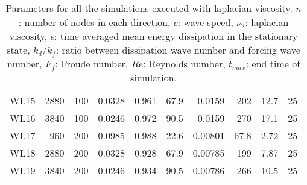 \begin{table}
\begin{center}
\begin{tabular}{lrrrrrrrrr}
WL15 & 2880 &  100 &   0.0328 &       0.961 &                    67.9 &  0.0159 &   202 &           12.7 &          25 \\
WL16 & 3840 &  100 &   0.0246 &       0.972 &                    90.5 &  0.0159 &   270 &           17.1 &          25 \\
WL17 &  960 &  200 &   0.0985 &       0.988 &                    22.6 & 0.00801 &  67.8 &           2.72 &          25 \\
WL18 & 2880 &  200 &   0.0328 &       0.928 &                    67.9 & 0.00785 &   199 &           7.87 &          25 \\
WL19 & 3840 &  200 &   0.0246 &       0.934 &                    90.5 & 0.00786 &   266 &           10.5 &          25 \\
\bottomrule
\end{tabular}

\caption{Parameters for all the simulations executed with laplacian viscosity.
$ n $: number of nodes in each direction, $ c $: wave speed, $ \nu_2 $: laplacian viscosity, $ \epsilon $: time
averaged mean energy dissipation in the stationary state, $ k_{d}/ k_f $: ratio
between dissipation wave number and forcing wave number, $F_f $: Froude
number, $Re$: Reynolds number, $ t_{max} $: end time of simulation.}
\end{center}
\end{table}

